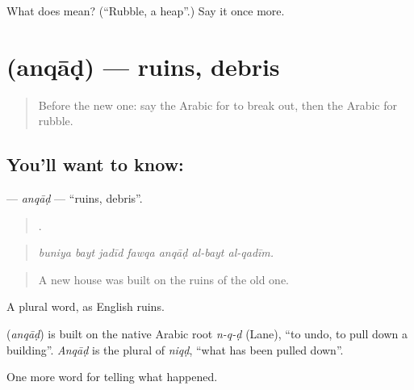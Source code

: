 \begin{tcolorbox}[breakable,colback=teal!4,colframe=teal!35!black,title={Before you move on}]
What does  mean? (\textquotedblleft{}Rubble, a heap\textquotedblright{}.) Say it once more.
\end{tcolorbox}
\section[\texorpdfstring{\ar{أنقاض} (anqāḍ)}{أنقاض (anqāḍ)}]{ (anqāḍ) — ruins, debris}

\label{lesson:AR-C316-anqad}



\begin{quote}
Before the new one: say the Arabic for to break out, then the Arabic for rubble.
\end{quote}

\subsection*{You'll want to know: }
\textbf{} — \emph{anqāḍ} — \textquotedblleft{}ruins, debris\textquotedblright{}.

\begin{quote}
      .
\end{quote}

\begin{quote}
\emph{buniya bayt jadīd fawqa anqāḍ al-bayt al-qadīm.}
\end{quote}

\begin{quote}
A new house was built on the ruins of the old one.
\end{quote}

A plural word, as English ruins.

\begin{cousinweb}
\textbf{} (\emph{anqāḍ}) is built on the native Arabic root \emph{n-q-ḍ} (Lane), \textquotedblleft{}to undo, to pull down a building\textquotedblright{}. \emph{Anqāḍ} is the plural of \emph{niqḍ}, \textquotedblleft{}what has been pulled down\textquotedblright{}.
\end{cousinweb}

\begin{grammarlens}[title={What you've built}]
One more word for telling what happened.
\end{grammarlens}

